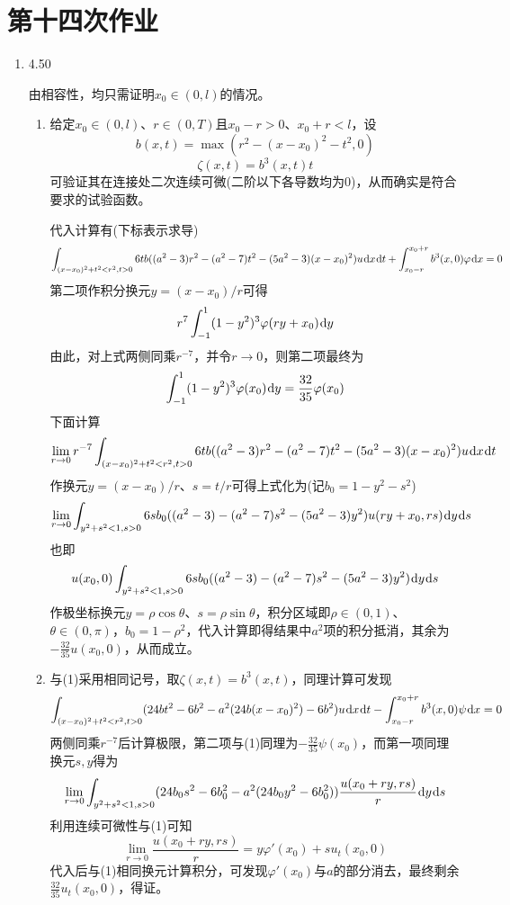 \documentclass[a4paper,UTF8,fontset=windows,10pt]{ctexart}
\newcommand*{\dr}{\hspace{0.07em}\mathrm{d}}
\begin{document}
\section{第十四次作业}
\begin{enumerate}
    \item 4.50
    
    由相容性，均只需证明$x_0\in(0,l)$的情况。
    \begin{enumerate}[(1)]
        \item 给定$x_0\in(0,l)$、$r\in(0,T)$且$x_0-r>0$、$x_0+r<l$，设
        $$b(x,t)=\max(r^2-(x-x_0)^2-t^2,0)$$
        $$\zeta(x,t)=b^3(x,t)t$$
        可验证其在连接处二次连续可微(二阶以下各导数均为0)，从而确实是符合要求的试验函数。
    
        代入计算有(下标表示求导)
        $$\int_{(x-x_0)^2+t^2<r^2,t>0}6tb((a^2-3)r^2-(a^2-7)t^2-(5a^2-3)(x-x_0)^2)u\dr x\dr t+\int_{x_0-r}^{x_0+r}b^3(x,0)\varphi\dr x=0$$
        第二项作积分换元$y=(x-x_0)/r$可得
        $$r^7\int_{-1}^1(1-y^2)^3\varphi(ry+x_0)\dr y$$
        由此，对上式两侧同乘$r^{-7}$，并令$r\to0$，则第二项最终为
        $$\int_{-1}^1(1-y^2)^3\varphi(x_0)\dr y=\frac{32}{35}\varphi(x_0)$$
        下面计算
        $$\lim_{r\to0}r^{-7}\int_{(x-x_0)^2+t^2<r^2,t>0}6tb((a^2-3)r^2-(a^2-7)t^2-(5a^2-3)(x-x_0)^2)u\dr x\dr t$$
        作换元$y=(x-x_0)/r$、$s=t/r$可得上式化为(记$b_0=1-y^2-s^2$)
        $$\lim_{r\to0}\int_{y^2+s^2<1,s>0}6sb_0((a^2-3)-(a^2-7)s^2-(5a^2-3)y^2)u(ry+x_0,rs)\dr y\dr s$$
        也即
        $$u(x_0,0)\int_{y^2+s^2<1,s>0}6sb_0((a^2-3)-(a^2-7)s^2-(5a^2-3)y^2)\dr y\dr s$$
        作极坐标换元$y=\rho\cos\theta$、$s=\rho\sin\theta$，积分区域即$\rho\in(0,1)$、$\theta\in(0,\pi)$，$b_0=1-\rho^2$，代入计算即得结果中$a^2$项的积分抵消，其余为$-\frac{32}{35}u(x_0,0)$，从而成立。
    
        \item 与(1)采用相同记号，取$\zeta(x,t)=b^3(x,t)$，同理计算可发现
        $$\int_{(x-x_0)^2+t^2<r^2,t>0}(24bt^2-6b^2-a^2(24b(x-x_0)^2)-6b^2)u\dr x\dr t-\int_{x_0-r}^{x_0+r}b^3(x,0)\psi\dr x=0$$
        两侧同乘$r^{-7}$后计算极限，第二项与(1)同理为$-\frac{32}{35}\psi(x_0)$，而第一项同理换元$s,y$得为
        $$\lim_{r\to0}\int_{y^2+s^2<1,s>0}(24b_0s^2-6b_0^2-a^2(24b_0y^2-6b_0^2))\frac{u(x_0+ry,rs)}{r}\dr y\dr s$$
        利用连续可微性与(1)可知
        $$\lim_{r\to0}\frac{u(x_0+ry,rs)}{r}=y\varphi'(x_0)+su_t(x_0,0)$$
        代入后与(1)相同换元计算积分，可发现$\varphi'(x_0)$与$a$的部分消去，最终剩余$\frac{32}{35}u_t(x_0,0)$，得证。
    \end{enumerate}
\end{enumerate}
\end{document}
